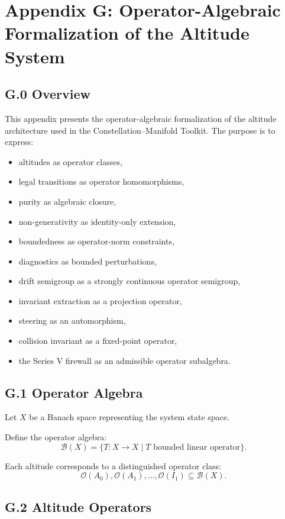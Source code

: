 \appendix
\section*{Appendix G: Operator-Algebraic Formalization of the Altitude System}

\subsection*{G.0 Overview}

This appendix presents the operator-algebraic formalization of the
altitude architecture used in the Constellation–Manifold Toolkit.
The purpose is to express:
\begin{itemize}
    \item altitudes as operator classes,
    \item legal transitions as operator homomorphisms,
    \item purity as algebraic closure,
    \item non-generativity as identity-only extension,
    \item boundedness as operator-norm constraints,
    \item diagnostics as bounded perturbations,
    \item drift semigroup as a strongly continuous operator semigroup,
    \item invariant extraction as a projection operator,
    \item steering as an automorphism,
    \item collision invariant as a fixed-point operator,
    \item the Series V firewall as an admissible operator subalgebra.
\end{itemize}

\subsection*{G.1 Operator Algebra}

Let $X$ be a Banach space representing the system state space.

Define the operator algebra:
\[
\mathcal{B}(X) = \{ T : X \to X \mid T \text{ bounded linear operator} \}.
\]

Each altitude corresponds to a distinguished operator class:
\[
\mathcal{O}(A_0), \mathcal{O}(A_1), \dots, \mathcal{O}(I_1)
\subseteq \mathcal{B}(X).
\]

\subsection*{G.2 Altitude Operators}

